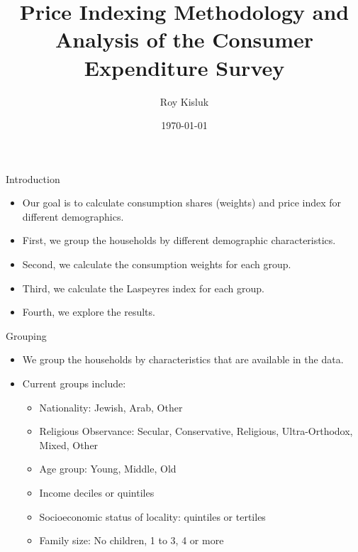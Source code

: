 \documentclass{beamer}
\title{Price Indexing Methodology and Analysis of the Consumer Expenditure Survey}
\author{Roy Kisluk}
\date{\today}
\begin{document}
\begin{frame}
    \titlepage
\end{frame}

\begin{frame}{Introduction}
    \begin{itemize}
        \item Our goal is to calculate consumption shares (weights) and price index for different demographics.
        \item First, we group the households by different demographic characteristics.
        \item Second, we calculate the consumption weights for each group.
        \item Third, we calculate the Laspeyres index for each group.
        \item Fourth, we explore the results.
    \end{itemize}
\end{frame}

\begin{frame}{Grouping}
    \begin{itemize}
        \item We group the households by characteristics that are available in the data.
        \item Current groups include:
              \begin{itemize}
                  \item Nationality: Jewish, Arab, Other
                  \item Religious Observance: Secular, Conservative, Religious, Ultra-Orthodox, Mixed, Other
                  \item Age group: Young, Middle, Old
                  \item Income deciles or quintiles
                  \item Socioeconomic status of locality: quintiles or tertiles
                  \item Family size: No children, 1 to 3, 4 or more
              \end{itemize}
    \end{itemize}
\end{frame}
\end{document}
